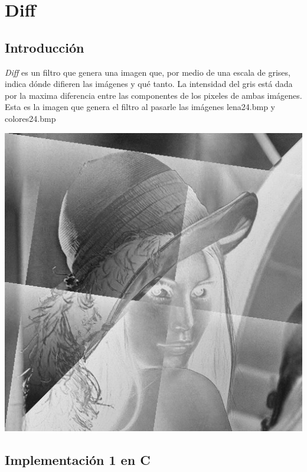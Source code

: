 \documentclass[10pt,a4paper,spanish]{article}
\begin{document}
\section{Diff}

\subsection{Introducción}

\textit{Diff} es un filtro que genera una imagen que, por medio de una escala de grises, indica dónde difieren las imágenes y qué tanto.
La intensidad del gris está dada por la maxima diferencia entre las componentes de los pixeles de ambas imágenes. \\

Esta es la imagen que genera el filtro al pasarle las imágenes lena24.bmp y colores24.bmp \\

\begin{center}\includegraphics[keepaspectratio]{diff_lena24_colores24.png}\end{center}

\subsection{Implementación 1 en C}
\end{document}

